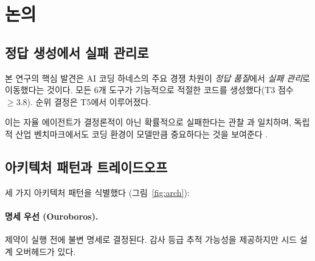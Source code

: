 \documentclass[11pt,a4paper]{article}
\begin{document}
\section{논의}
\label{sec:discussion}

\subsection{정답 생성에서 실패 관리로}

본 연구의 핵심 발견은 AI 코딩 하네스의 주요 경쟁 차원이 \emph{정답 품질}에서 \emph{실패 관리}로 이동했다는 것이다.
모든 6개 도구가 기능적으로 적절한 코드를 생성했다(T3 점수 $\geq 3.8$).
순위 결정은 T5에서 이루어졌다.

이는 자율 에이전트가 결정론적이 아닌 확률적으로 실패한다는 관찰 \cite{guardrailsmd2026}과 일치하며, 독립적 산업 벤치마크에서도 코딩 환경이 모델만큼 중요하다는 것을 보여준다 \cite{render2025benchmark}.

\subsection{아키텍처 패턴과 트레이드오프}

세 가지 아키텍처 패턴을 식별했다 (그림~\ref{fig:arch}):

\paragraph{명세 우선 (Ouroboros).}
제약이 실행 전에 불변 명세로 결정된다.
감사 등급 추적 가능성을 제공하지만 시드 설계 오버헤드가 있다.
\end{document}
